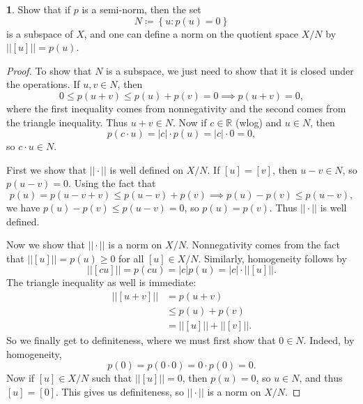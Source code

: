 \documentclass[12pt]{article}
\theoremstyle{definition}
\newtheorem{ex}{}
\begin{document}
\begin{ex}
	Show that if $p$ is a semi-norm, then the set \begin{equation*}
		N \coloneq \left\lbrace u : p(u) = 0 \right\rbrace
	\end{equation*}
	is a subspace of $X$, and one can define a norm on the quotient space $X/N$ by $||[u]|| = p(u)$.
\end{ex}
\begin{proof}
	To show that $N$ is a subspace, we just need to show that it is closed under the operations.
	If $u, v \in N$, then \begin{equation*}
		0 \leq p(u + v) \leq p(u) + p(v) = 0 \implies p(u+v) = 0,
	\end{equation*}
	where the first inequality comes from nonnegativity and the second comes from the triangle inequality.
	Thus $u + v \in N$.
	Now if $c \in \mathbb{R}$ (wlog) and $u \in N$, then \begin{equation*}
		p(c\cdot u) = |c|\cdot p(u) = |c|\cdot 0 = 0,
	\end{equation*}
	so $c\cdot u \in N$.

	First we show that $||\cdot||$ is well defined on $X/N$.
	If $[u] = [v]$, then $u - v \in N$, so $p(u - v) = 0$.
	Using the fact that \begin{equation*}
		p(u) = p(u - v + v) \leq p(u - v) + p(v) \implies p(u) - p(v) \leq p(u - v),
	\end{equation*}
	we have $p(u) - p(v) \leq p(u - v) = 0$, so $p(u) = p(v)$.
	Thus $||\cdot||$ is well defined.

	Now we show that $||\cdot||$ is a norm on $X/N$.
	Nonnegativity comes from the fact that $||[u]|| = p(u) \geq 0$ for all $[u] \in X/N$.
	Similarly, homogeneity follows by \begin{equation*}
		||[cu]|| = p(cu) = |c| p(u) = |c|\cdot ||[u]||.
	\end{equation*}
	The triangle inequality as well is immediate: \begin{align*}
		||[u + v]|| & = p(u + v)           \\
		            & \leq p(u) + p(v)     \\
		            & = ||[u]|| + ||[v]||.
	\end{align*}
	So we finally get to definiteness, where we must first show that $0 \in N$.
	Indeed, by homogeneity, \begin{equation*}
		p(0) = p(0 \cdot 0) = 0 \cdot p(0) = 0.
	\end{equation*}
	Now if $[u] \in X/N$ such that $||[u]|| = 0$, then $p(u) = 0$, so $u \in N$, and thus $[u] = [0]$.
	This gives us definiteness, so $|| \cdot ||$ is a norm on $X/N$.
\end{proof}
\end{document}
